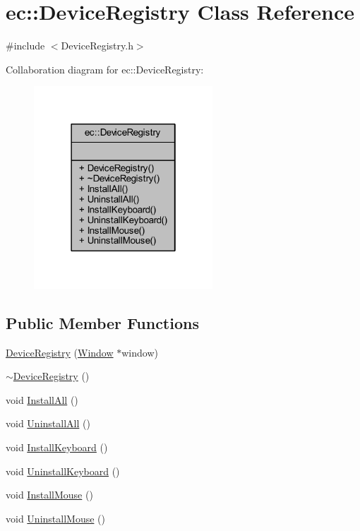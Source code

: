 \hypertarget{classec_1_1_device_registry}{}\section{ec\+:\+:Device\+Registry Class Reference}
\label{classec_1_1_device_registry}


{\ttfamily \#include $<$Device\+Registry.\+h$>$}



Collaboration diagram for ec\+:\+:Device\+Registry\+:
\nopagebreak
\begin{figure}[H]
\begin{center}
\leavevmode
\includegraphics[width=190pt]{classec_1_1_device_registry__coll__graph}
\end{center}
\end{figure}
\subsection*{Public Member Functions}
\begin{DoxyCompactItemize}
\item 
\mbox{\hyperlink{classec_1_1_device_registry_adbe0912caca04d8c401f58b57dc11524}{Device\+Registry}} (\mbox{\hyperlink{classec_1_1_window}{Window}} $\ast$window)
\item 
\mbox{\hyperlink{classec_1_1_device_registry_a75dff0df1527fe9d7e75b25f3dff4028}{$\sim$\+Device\+Registry}} ()
\item 
void \mbox{\hyperlink{classec_1_1_device_registry_a2454c6d36e94bce6a5077149680bf96a}{Install\+All}} ()
\item 
void \mbox{\hyperlink{classec_1_1_device_registry_a74ea0255087f1e99c6068663b9d43385}{Uninstall\+All}} ()
\item 
void \mbox{\hyperlink{classec_1_1_device_registry_af03e4aa3a084e2519c044b7139000829}{Install\+Keyboard}} ()
\item 
void \mbox{\hyperlink{classec_1_1_device_registry_a412a6a6b52a2b1b755b0d43889a3c755}{Uninstall\+Keyboard}} ()
\item 
void \mbox{\hyperlink{classec_1_1_device_registry_ab06d3edc52bc1bc296b4b7e2303d70c6}{Install\+Mouse}} ()
\item 
void \mbox{\hyperlink{classec_1_1_device_registry_a12cc6592593ea13bf2ea1d34e93ae6f6}{Uninstall\+Mouse}} ()
\end{DoxyCompactItemize}


